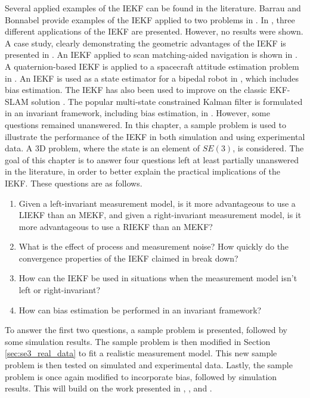 
Several applied examples of the IEKF can be found in the literature. Barrau and Bonnabel provide examples of the IEKF applied to two problems in \cite{Barrau2017}. In \cite{Barrau2017aa}, three different applications of the IEKF are presented. However, no results were shown. A case study, clearly demonstrating the geometric advantages of the IEKF is presented in \cite{Barrau2016}. An IEKF applied to scan matching-aided navigation is shown in \cite{Barczyk2016}. A quaternion-based IEKF is applied to a spacecraft attitude estimation problem in \cite{Gui2017}. An IEKF is used as a state estimator for a bipedal robot in \cite{Hartley2018}, which includes bias estimation. The IEKF has also been used to improve on the classic EKF-SLAM solution \cite{Brossard2019}. The popular multi-state constrained Kalman filter \cite{Mourikis2007} is formulated in an invariant framework, including bias estimation, in \cite{Heo2018}. However, some questions remained unanswered. In this chapter, a sample problem is used to illustrate the performance of the IEKF in both simulation and using experimental data. A 3D problem, where the state is an element of $SE(3)$, is considered. The goal of this chapter is to answer four questions left at least partially unanswered in the literature, in order to better explain the practical implications of the IEKF. These questions are as follows.
\begin{enumerate}
	\item Given a left-invariant measurement model, is it more advantageous to use a LIEKF than an MEKF, and given a right-invariant measurement model, is it more advantageous to use a RIEKF than an MEKF?
	
	\item What is the effect of process and measurement noise? How quickly do the convergence properties of the IEKF claimed in \cite{Barrau2017,Barrau2018} break down?
	
	\item How can the IEKF be used in situations when the measurement model isn't left or right-invariant? 
	
	\item How can bias estimation be performed in an invariant framework?
	
\end{enumerate}

To answer the first two questions, a sample problem is presented, followed by some simulation results. The sample problem is then modified in Section \ref{sec:se3_real_data} to fit a realistic measurement model. This new sample problem is then tested on simulated and experimental data. Lastly, the sample problem is once again modified to incorporate bias, followed by simulation results. This will build on the work presented in , \cite{Barrau2015}, \cite{Hartley2018} and \cite{Heo2018}.

